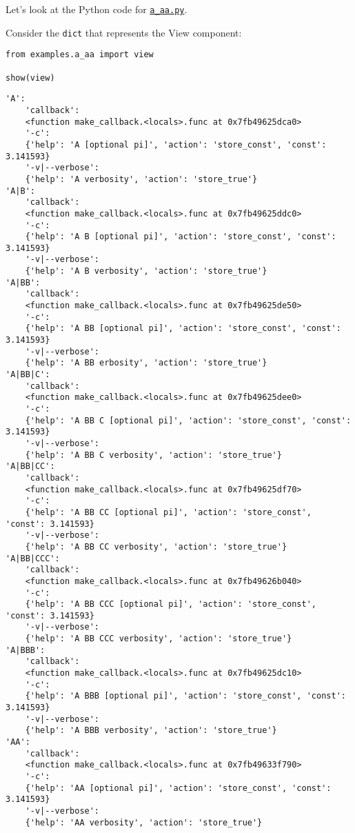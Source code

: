 \documentclass[10pt]{amsart}
\numberwithin{equation}{section}
\begin{document}
Let's look at the Python code
for \href{https://raw.githubusercontent.com/tharte/parsearg/master/doc/examples/a\_aa.py}{\texttt{a\_aa.py}}.

Consider the \texttt{dict} that represents the View component:
\begin{verbatim}
from examples.a_aa import view

show(view)
\end{verbatim}

\begin{verbatim}
'A':
    'callback':
    <function make_callback.<locals>.func at 0x7fb49625dca0>
    '-c':
    {'help': 'A [optional pi]', 'action': 'store_const', 'const': 3.141593}
    '-v|--verbose':
    {'help': 'A verbosity', 'action': 'store_true'}
'A|B':
    'callback':
    <function make_callback.<locals>.func at 0x7fb49625ddc0>
    '-c':
    {'help': 'A B [optional pi]', 'action': 'store_const', 'const': 3.141593}
    '-v|--verbose':
    {'help': 'A B verbosity', 'action': 'store_true'}
'A|BB':
    'callback':
    <function make_callback.<locals>.func at 0x7fb49625de50>
    '-c':
    {'help': 'A BB [optional pi]', 'action': 'store_const', 'const': 3.141593}
    '-v|--verbose':
    {'help': 'A BB erbosity', 'action': 'store_true'}
'A|BB|C':
    'callback':
    <function make_callback.<locals>.func at 0x7fb49625dee0>
    '-c':
    {'help': 'A BB C [optional pi]', 'action': 'store_const', 'const': 3.141593}
    '-v|--verbose':
    {'help': 'A BB C verbosity', 'action': 'store_true'}
'A|BB|CC':
    'callback':
    <function make_callback.<locals>.func at 0x7fb49625df70>
    '-c':
    {'help': 'A BB CC [optional pi]', 'action': 'store_const', 'const': 3.141593}
    '-v|--verbose':
    {'help': 'A BB CC verbosity', 'action': 'store_true'}
'A|BB|CCC':
    'callback':
    <function make_callback.<locals>.func at 0x7fb49626b040>
    '-c':
    {'help': 'A BB CCC [optional pi]', 'action': 'store_const', 'const': 3.141593}
    '-v|--verbose':
    {'help': 'A BB CCC verbosity', 'action': 'store_true'}
'A|BBB':
    'callback':
    <function make_callback.<locals>.func at 0x7fb49625dc10>
    '-c':
    {'help': 'A BBB [optional pi]', 'action': 'store_const', 'const': 3.141593}
    '-v|--verbose':
    {'help': 'A BBB verbosity', 'action': 'store_true'}
'AA':
    'callback':
    <function make_callback.<locals>.func at 0x7fb49633f790>
    '-c':
    {'help': 'AA [optional pi]', 'action': 'store_const', 'const': 3.141593}
    '-v|--verbose':
    {'help': 'AA verbosity', 'action': 'store_true'}

\end{verbatim}
\end{document}
